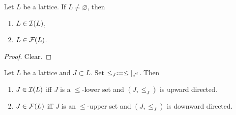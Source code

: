 \documentclass{book}
\begin{document}
	\begin{ex}
		Let $L$ be a lattice. If $L \neq \varnothing$, then 
		\begin{enumerate}
			\item $L \in \mathcal{I}(L)$,
			\item $L \in \mathcal{F}(L)$.
		\end{enumerate}
	\end{ex}
	
	\begin{proof}
		Clear. 
	\end{proof}
	
	\begin{ex}
		Let $L$ be a lattice and $J \subset L$. Set $\leq_J \vcentcolon= \leq|_{J^2}$. Then
		\begin{enumerate}
			\item $J \in \mathcal{I}(L)$ iff $J$ is a $\leq$-lower set and $(J, \leq_J)$ is upward directed.   
			\item $J \in \mathcal{F}(L)$ iff $J$ is an $\leq$-upper set and $(J, \leq_J)$ is downward directed.
		\end{enumerate}
	\end{ex}
	
\end{document}
